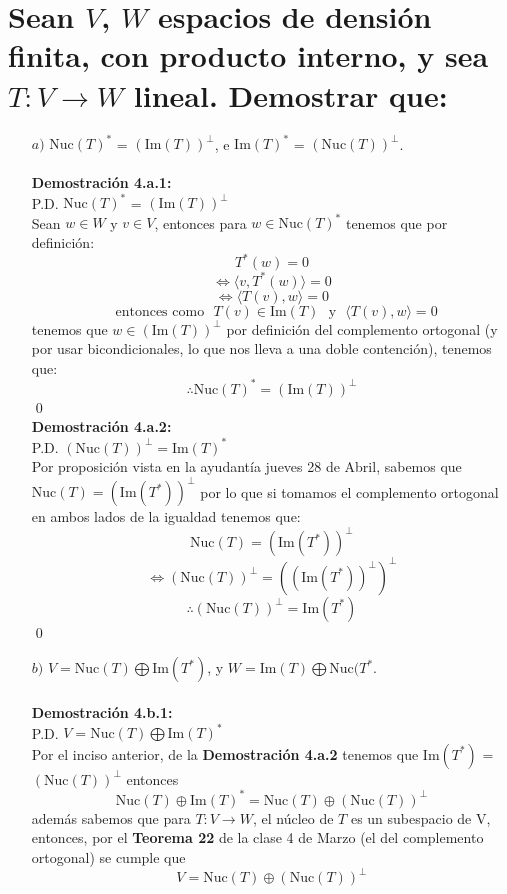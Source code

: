 \section{Sean $V$, $W$ espacios de densión finita, con producto interno, y sea $T:V \longrightarrow W$ lineal. Demostrar que:}
\begin{itemize}
    \item [$a)$] $\text{Nuc}(T)^*$ = $(\text{Im}(T))^\perp $, e $\text{Im}(T)^*$ = $(\text{Nuc}(T))^\perp $.\\\\
    \textbf{Demostraci\'on 4.a.1:}\\
    P.D. $\text{Nuc}(T)^*$ = $(\text{Im}(T))^\perp $\\
    Sean $w\in W$ y $v\in V$, entonces para $w\in \text{Nuc}(T)^*$ tenemos que por definición:
    \[T^* (w)=0 \]\[\Longleftrightarrow \langle v,T^* (w)\rangle = 0\]\[\Longleftrightarrow \langle T(v),w\rangle=0\] \[~~~\text{entonces como}~~~ T(v)\in \text{Im}(T)~~~\text{y}~~~ \langle T(v),w\rangle=0\]
    tenemos que $w \in (\text{Im}(T))^\perp$ por definición del complemento ortogonal (y por usar bicondicionales, lo que nos lleva a una doble contenci\'on), tenemos que: \[\therefore \text{Nuc}(T)^* = (\text{Im}(T))^\perp\]\qed\\
    \textbf{Demostraci\'on 4.a.2:}\\
    P.D. $(\text{Nuc}(T))^\perp = \text{Im}(T)^*$\\
    Por proposición vista en la ayudantía jueves 28 de Abril, sabemos que $\text{Nuc}(T) = (\text{Im}(T^*))^\perp$ por lo que si tomamos el complemento ortogonal en ambos lados de la igualdad tenemos que: \[\text{Nuc}(T) = (\text{Im}(T^*))^\perp\] \[\Longleftrightarrow (\text{Nuc}(T))^\perp = ((\text{Im}(T^*))^\perp)^\perp\] \[\therefore (\text{Nuc}(T))^\perp =\text{Im}(T^*)\]\qed
    \item [$b)$] $V=\text{Nuc}(T)\bigoplus \text{Im}(T^*)$, y $W=\text{Im}(T)\bigoplus \text{Nuc}(T^*$.\\\\
    \textbf{Demostraci\'on 4.b.1:}\\
    P.D. $V=\text{Nuc}(T)\bigoplus \text{Im}(T)^*$\\
    Por el inciso anterior, de la \textbf{Demostración 4.a.2} tenemos que $\text{Im}(T^*)$ = $(\text{Nuc}(T))^\perp$ entonces 
    \[\text{Nuc}(T)\oplus \text{Im}(T)^* = \text{Nuc}(T)\oplus (\text{Nuc}(T))^\perp\]
    además sabemos que para $T:V\longrightarrow W$, el núcleo de $T$ es un subespacio de V, entonces, por el \textbf{Teorema 22} de la clase 4 de Marzo (el del complemento ortogonal) se cumple que \[V= \text{Nuc}(T)\oplus (\text{Nuc}(T))^\bot\]

\end{itemize}
